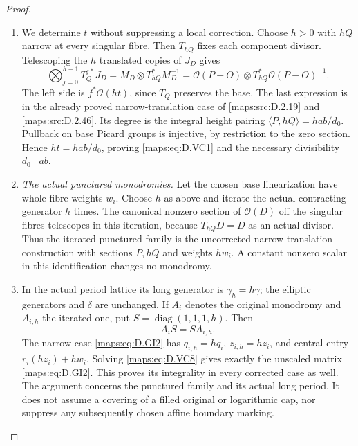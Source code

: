 \begin{proof}
\begin{enumerate}[label=\arabic*.,leftmargin=*]
\item We determine $t$ without suppressing a local correction.
Choose $h>0$ with $hQ$ narrow at every singular fibre.
Then $T_{hQ}$ fixes each component divisor. Telescoping
the $h$ translated copies of $J_D$ gives
\[
 \bigotimes_{j=0}^{h-1} T_Q^{j*}J_D
       =M_D\otimes T_{hQ}^*M_D^{-1}
       =\mathcal O(P-O)\otimes
                    T_{hQ}^*\mathcal O(P-O)^{-1}.          \tag{D.VC5}\label{maps:eq:D.VC5}
\]
The left side is $f^*\mathcal O(ht)$, since $T_Q$ preserves
the base. The last expression is in the already proved
narrow-translation case of \ref{maps:src:D.2.19} and \ref{maps:src:D.2.46}. Its degree
is the integral height pairing
$\langle P,hQ\rangle=hab/d_0$.
Pullback on base Picard groups is injective, by restriction
to the zero section. Hence $ht=hab/d_0$, proving \eqref{maps:eq:D.VC1}
and the necessary divisibility $d_0\mid ab$.

\item \emph{The actual punctured monodromies.}
Let the chosen base linearization have whole-fibre weights $w_i$.
Choose $h$ as above and iterate the actual contracting generator
$h$ times. The canonical nonzero section of $\mathcal O(D)$
off the singular fibres telescopes in this iteration, because
$T_{hQ}D=D$ as an actual divisor. Thus the iterated punctured
family is the uncorrected narrow-translation construction with
sections $P,hQ$ and weights $h w_i$. A constant nonzero scalar
in this identification changes no monodromy.

\item In the actual period lattice its long generator is
$\gamma_h=h\gamma$; the elliptic generators and $\delta$ are
unchanged. If $A_i$ denotes the original monodromy and $A_{i,h}$
the iterated one, put $S=\operatorname{diag}(1,1,1,h)$. Then
\[
                         A_iS=SA_{i,h}.                    \tag{D.VC8}\label{maps:eq:D.VC8}
\]
The narrow case \eqref{maps:eq:D.GI2} has $q_{i,h}=h q_i$,
$z_{i,h}=h z_i$, and central entry $r_i(hz_i)+h w_i$.
Solving \eqref{maps:eq:D.VC8} gives exactly the unscaled matrix \eqref{maps:eq:D.GI2}.
This proves its integrality in every corrected case as well.
The argument concerns the punctured family and its actual long
period. It does not assume a covering of a filled original or
logarithmic cap, nor suppress any subsequently chosen affine
boundary marking.


\end{enumerate}
\end{proof}
